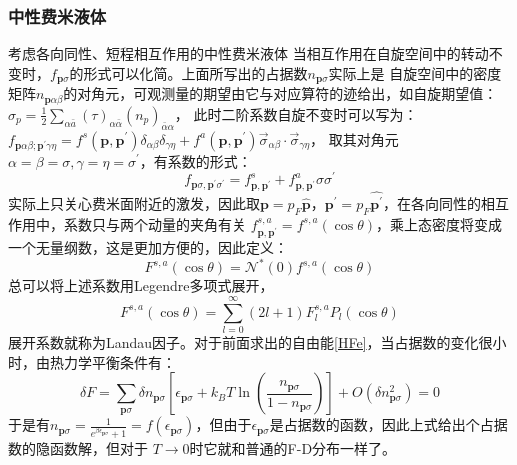\documentclass[10pt,openany]{book}
\theoremstyle{thmstyle} %
\theoremstyle{defstyle} %
\theoremstyle{prostyle} %
\begin{document}
\subsubsection{中性费米液体}
考虑各向同性、短程相互作用的中性费米液体
当相互作用在自旋空间中的转动不变时，$ f_{\mathbf{p} \sigma} $的形式可以化简。上面所写出的占据数$ n_{\mathbf{p} \sigma }$实际上是
自旋空间中的密度矩阵$ n_{\mathbf{p} \alpha\beta} $的对角元，可观测量的期望由它与对应算符的迹给出，如自旋期望值：$  \sigma_p=\frac{1}{2} \sum_{\alpha \bar{a}}(\tau)_{\alpha \bar{\alpha}}\left(n_p\right)_{\bar{\alpha} \alpha}$，
此时二阶系数自旋不变时可以写为：$ f_{\mathbf{p} \alpha \beta ; \mathbf{p}^{\prime} \gamma \eta}=f^s\left(\mathbf{p}, \mathbf{p}^{\prime}\right) \delta_{\alpha \beta} \delta_{\gamma \eta}+f^a\left(\mathbf{p}, \mathbf{p}^{\prime}\right) \vec{\sigma}_{\alpha \beta} \cdot \vec{\sigma}_{\gamma \eta} $，
取其对角元$ \alpha=\beta=\sigma,\gamma=\eta=\sigma^\prime $，有系数的形式：
\begin{equation}
	f_{\mathbf{p} \sigma, \mathbf{p}^{\prime} \sigma^{\prime}}=f_{\mathbf{p}, \mathbf{p}^{\prime}}^s+f_{\mathbf{p}, \mathbf{p}^{\prime}}^a \sigma \sigma^{\prime}
\end{equation}   
实际上只关心费米面附近的激发，因此取$ \mathbf{p}=p_F \hat{\mathbf{p}}，\mathbf{p^\prime}=p_F \hat{\mathbf{p^\prime}} $，在各向同性的相互作用中，系数只与两个动量的夹角有关
$ f_{\mathbf{p}, \mathbf{p}^{\prime}}^{s, a}=f^{s, a}(\cos \theta) $，乘上态密度将变成一个无量纲数，这是更加方便的，因此定义：
\begin{equation}
	F^{s, a}(\cos \theta)=\mathcal{N}^*(0) f^{s, a}(\cos \theta)
\end{equation}  
总可以将上述系数用Legendre多项式展开，
\begin{equation}
	F^{s, a}(\cos \theta)=\sum_{l=0}^{\infty}(2 l+1) F_l^{s, a} P_l(\cos \theta)
\end{equation}
展开系数就称为Landau因子。对于前面求出的自由能\eqref{HFe}，当占据数的变化很小时，由热力学平衡条件有：
\begin{equation}
	\delta F=\sum_{\mathbf{p} \sigma} \delta n_{\mathbf{p} \sigma}\left[\epsilon_{\mathbf{p} \sigma}+k_B T \ln \left(\frac{n_{\mathbf{p} \sigma}}{1-n_{\mathbf{p} \sigma}}\right)\right]+O\left(\delta n_{\mathbf{p} \sigma}^2\right)=0
\end{equation} 
于是有$ n_{\mathbf{p} \sigma}=\frac{1}{e^{\beta \epsilon_{\mathbf{p} \sigma}}+1}=f\left(\epsilon_{\mathbf{p} \sigma}\right) $，但由于$ \epsilon_{\mathbf{p} \sigma} $是占据数的函数，因此上式给出个占据数的隐函数解，但对于
$ T\to 0 $时它就和普通的F-D分布一样了。\\
\end{document}
